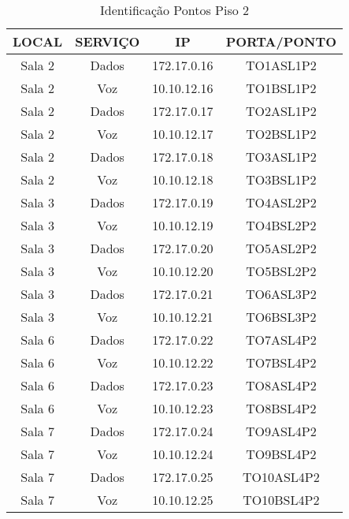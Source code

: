 \begin{table}[]
\centering
\caption{Identificação Pontos Piso 2}
\label{my-label}
\begin{tabular}{cccc}
\hline
\textbf{LOCAL}  & \textbf{SERVIÇO} & \textbf{IP} & \textbf{PORTA/PONTO} \\ \hline
Sala 2          & Dados            & 172.17.0.16 & TO1ASL1P2            \\ \hline
Sala 2          & Voz              & 10.10.12.16 & TO1BSL1P2            \\ \hline
Sala 2          & Dados            & 172.17.0.17 & TO2ASL1P2            \\ \hline
Sala 2          & Voz              & 10.10.12.17 & TO2BSL1P2            \\ \hline
Sala 2          & Dados            & 172.17.0.18 & TO3ASL1P2            \\ \hline
Sala 2          & Voz              & 10.10.12.18 & TO3BSL1P2            \\ \hline
Sala 3          & Dados            & 172.17.0.19 & TO4ASL2P2            \\ \hline
Sala 3          & Voz              & 10.10.12.19 & TO4BSL2P2            \\ \hline
Sala 3          & Dados            & 172.17.0.20 & TO5ASL2P2            \\ \hline
Sala 3          & Voz              & 10.10.12.20 & TO5BSL2P2            \\ \hline
Sala 3          & Dados            & 172.17.0.21 & TO6ASL3P2            \\ \hline
Sala 3          & Voz              & 10.10.12.21 & TO6BSL3P2            \\ \hline
Sala 6          & Dados            & 172.17.0.22 & TO7ASL4P2            \\ \hline
Sala 6          & Voz              & 10.10.12.22 & TO7BSL4P2            \\ \hline
Sala 6          & Dados            & 172.17.0.23 & TO8ASL4P2            \\ \hline
Sala 6          & Voz              & 10.10.12.23 & TO8BSL4P2            \\ \hline
Sala 7          & Dados            & 172.17.0.24 & TO9ASL4P2            \\ \hline
Sala 7          & Voz              & 10.10.12.24 & TO9BSL4P2            \\ \hline
Sala 7          & Dados            & 172.17.0.25 & TO10ASL4P2           \\ \hline
Sala 7          & Voz              & 10.10.12.25 & TO10BSL4P2           \\ \hline
\end{tabular}
\end{table}